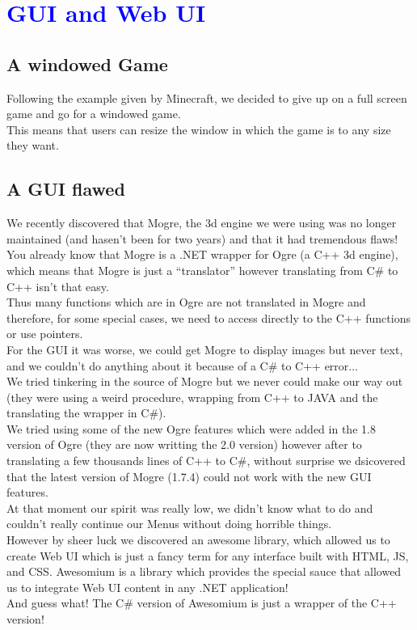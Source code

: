 \documentclass[article]{report}         %
\begin{document}
    \chapter{\textcolor{blue}{GUI and Web UI}}
      \section{A windowed Game}
        Following the example given by Minecraft, we decided to give up on a full screen game and go for a windowed game.\\
        This means that users can resize the window in which the game is to any size they want.\\
      \section{A GUI flawed}
        We recently discovered that Mogre, the 3d engine we were using was no longer maintained (and hasen't been for two years) and that it had tremendous flaws!\\
        You already know that Mogre is a .NET wrapper for Ogre (a C++ 3d engine), which means that Mogre is just a ``translator'' however translating from C\# to C++ isn't that easy.\\
        Thus many functions which are in Ogre are not translated in Mogre and therefore, for some special cases, we need to access directly to the C++ functions or use pointers.\\

        For the GUI it was worse, we could get Mogre to display images but never text, and we couldn't do anything about it because of a C\# to C++ error...\\
        We tried tinkering in the source of Mogre but we never could make our way out (they were using a weird procedure, wrapping from C++ to JAVA and the translating the wrapper in C\#).\\
        We tried using some of the new Ogre features which were added in the 1.8 version of Ogre (they are now writting the 2.0 version) however after to translating a few thousands lines of C++ to C\#, without surprise we dsicovered that the latest version of Mogre (1.7.4) could not work with the new GUI features.\\

        At that moment our spirit was really low, we didn't know what to do and couldn't really continue our Menus without doing horrible things.\\
        However by sheer luck we discovered an awesome library, which allowed us to create Web UI which is just a fancy term for any interface built with HTML, JS, and CSS.
        Awesomium is a library which provides the special sauce that allowed us to integrate Web UI content in any .NET application! \\
        And guess what! The C\# version of Awesomium is just a wrapper of the C++ version!
\end{document}
